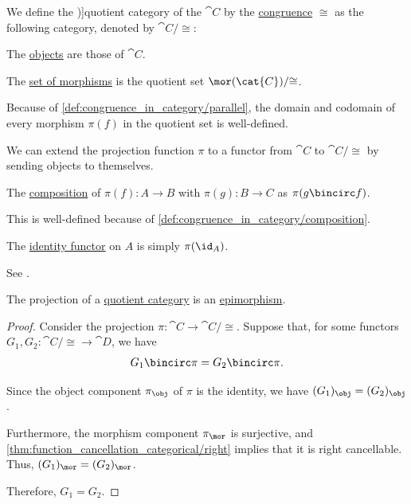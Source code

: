 \begin{definition}\label{def:quotient_category}
  We define the \term[en=quotient (\cite[\S 6.4.1]{Schubert1972Categories})]{quotient category} of the \( \cat{C} \) by the \hyperref[def:congruence_in_category]{congruence} \( {\cong} \) as the following category, denoted by \( \cat{C} / {\cong} \):
  \begin{thmenum}
     The \hyperref[def:category/objects]{objects} are those of \( \cat{C} \).

     The \hyperref[def:category/morphisms]{set of morphisms} is the quotient set \( \mor(\cat{C}) / {\cong} \).

    Because of \cref{def:congruence_in_category/parallel}, the domain and codomain of every morphism \( \pi(f) \) in the quotient set is well-defined.

    We can extend the projection function \( \pi \) to a functor from \( \cat{C} \) to \( \cat{C} / {\cong} \) by sending objects to themselves.

     The \hyperref[def:category/composition]{composition} of \( \pi(f): A \to B \) with \( \pi(g): B \to C \) as \( \pi(g \bincirc f) \).

    This is well-defined because of \cref{def:congruence_in_category/composition}.

     The \hyperref[def:category/identity]{identity functor} on \( A \) is simply \( \pi(\id_A) \).
  \end{thmenum}
\end{definition}
\begin{comments}
  \item See .
\end{comments}

\begin{proposition}\label{thm:quotient_category_projection_is_epimorphism}
  The projection of a \hyperref[def:quotient_category]{quotient category} is an \hyperref[def:morphism_cancellation/right]{epimorphism}.
\end{proposition}
\begin{proof}
  Consider the projection \( \pi: \cat{C} \to \cat{C} / {\cong} \). Suppose that, for some functors \( G_1, G_2: \cat{C} / {\cong} \to \cat{D} \), we have
  \begin{equation*}
    G_1 \bincirc \pi = G_2 \bincirc \pi.
  \end{equation*}

  Since the object component \( \pi_{\obj} \) of \( \pi \) is the identity, we have \( (G_1)_{\obj} = (G_2)_{\obj} \).

  Furthermore, the morphism component \( \pi_{\mor} \) is surjective, and \cref{thm:function_cancellation_categorical/right} implies that it is right cancellable. Thus, \( (G_1)_{\mor} = (G_2)_{\mor} \).

  Therefore, \( G_1 = G_2 \).
\end{proof}

